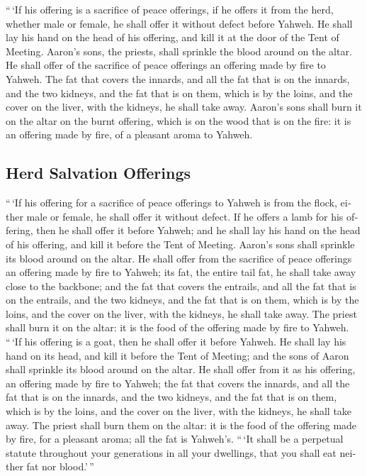 \begin{paracol}{2}
\begin{otherlanguage}{english}
 ``\,`If his offering is a sacrifice of peace offerings,
if he offers it from the herd, whether male or female, he shall offer it
without defect before Yahweh.  He shall lay his hand on
the head of his offering, and kill it at the door of the Tent of
Meeting. Aaron's sons, the priests, shall sprinkle the blood around on
the altar.  He shall offer of the sacrifice of peace
offerings an offering made by fire to Yahweh. The fat that covers the
innards, and all the fat that is on the innards,  and the
two kidneys, and the fat that is on them, which is by the loins, and the
cover on the liver, with the kidneys, he shall take away. 
Aaron's sons shall burn it on the altar on the burnt offering, which is
on the wood that is on the fire: it is an offering made by fire, of a
pleasant aroma to Yahweh.

\hypertarget{herd-salvation-offerings}{%
\subsection{Herd Salvation Offerings}\label{herd-salvation-offerings}}

 ``\,`If his offering for a sacrifice of peace offerings
to Yahweh is from the flock, either male or female, he shall offer it
without defect.  If he offers a lamb for his offering,
then he shall offer it before Yahweh;  and he shall lay
his hand on the head of his offering, and kill it before the Tent of
Meeting. Aaron's sons shall sprinkle its blood around on the altar.
 He shall offer from the sacrifice of peace offerings an
offering made by fire to Yahweh; its fat, the entire tail fat, he shall
take away close to the backbone; and the fat that covers the entrails,
and all the fat that is on the entrails,  and the two
kidneys, and the fat that is on them, which is by the loins, and the
cover on the liver, with the kidneys, he shall take away.
 The priest shall burn it on the altar: it is the food of
the offering made by fire to Yahweh.  ``\,`If his
offering is a goat, then he shall offer it before Yahweh.
 He shall lay his hand on its head, and kill it before
the Tent of Meeting; and the sons of Aaron shall sprinkle its blood
around on the altar.  He shall offer from it as his
offering, an offering made by fire to Yahweh; the fat that covers the
innards, and all the fat that is on the innards,  and the
two kidneys, and the fat that is on them, which is by the loins, and the
cover on the liver, with the kidneys, he shall take away.
 The priest shall burn them on the altar: it is the food
of the offering made by fire, for a pleasant aroma; all the fat is
Yahweh's.  ``\,`It shall be a perpetual statute
throughout your generations in all your dwellings, that you shall eat
neither fat nor blood.'\,''


\end{otherlanguage}
\end{paracol}
